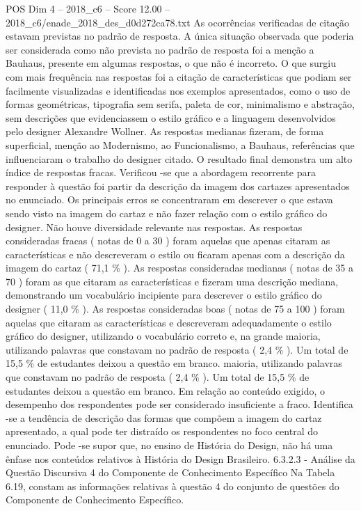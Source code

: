 \begin{textsample}{POS Dim 4 – 2018\_c6 – Score 12.00 – 2018\_c6/enade\_2018\_des\_d0d272ca78.txt}
As ocorrências verificadas de citação estavam previstas no padrão de resposta.
A única situação observada que poderia ser considerada como não prevista no padrão de resposta foi a menção a Bauhaus, presente em algumas respostas, o que não é incorreto.
O que surgiu com mais frequência nas respostas foi a citação de características que podiam ser facilmente visualizadas e identificadas nos exemplos apresentados, como o uso de formas geométricas, tipografia sem serifa, paleta de cor, minimalismo e abstração, sem descrições que evidenciassem o estilo gráfico e a linguagem desenvolvidos pelo designer Alexandre Wollner.
As respostas medianas fizeram, de forma superficial, menção ao Modernismo, ao Funcionalismo, a Bauhaus, referências que influenciaram o trabalho do designer citado.
O resultado final demonstra um alto índice de respostas fracas.
Verificou -se que a abordagem recorrente para responder à questão foi partir da descrição da imagem dos cartazes apresentados no enunciado.
Os principais erros se concentraram em descrever o que estava sendo visto na imagem do cartaz e não fazer relação com o estilo gráfico do designer.
Não houve diversidade relevante nas respostas.
As respostas consideradas fracas ( notas de 0 a 30 ) foram aquelas que apenas citaram as características e não descreveram o estilo ou ficaram apenas com a descrição da imagem do cartaz ( 71,1 \% ).
As respostas consideradas medianas ( notas de 35 a 70 ) foram as que citaram as características e fizeram uma descrição mediana, demonstrando um vocabulário incipiente para descrever o estilo gráfico do designer ( 11,0 \% ).
As respostas consideradas boas ( notas de 75 a 100 ) foram aquelas que citaram as características e descreveram adequadamente o estilo gráfico do designer, utilizando o vocabulário correto e, na grande maioria, utilizando palavras que constavam no padrão de resposta ( 2,4 \% ).
Um total de 15,5 \% de estudantes deixou a questão em branco. maioria, utilizando palavras que constavam no padrão de resposta ( 2,4 \% ).
Um total de 15,5 \% de estudantes deixou a questão em branco.
Em relação ao conteúdo exigido, o desempenho dos respondentes pode ser considerado insuficiente a fraco.
Identifica -se a tendência de descrição das formas que compõem a imagem do cartaz apresentado, a qual pode ter distraído os respondentes no foco central do enunciado.
Pode -se supor que, no ensino de História do Design, não há uma ênfase nos conteúdos relativos à História do Design Brasileiro. 6.3.2.3 - Análise da Questão Discursiva 4 do Componente de Conhecimento Específico Na Tabela 6.19, constam as informações relativas à questão 4 do conjunto de questões do Componente de Conhecimento Específico.

\end{textsample}
